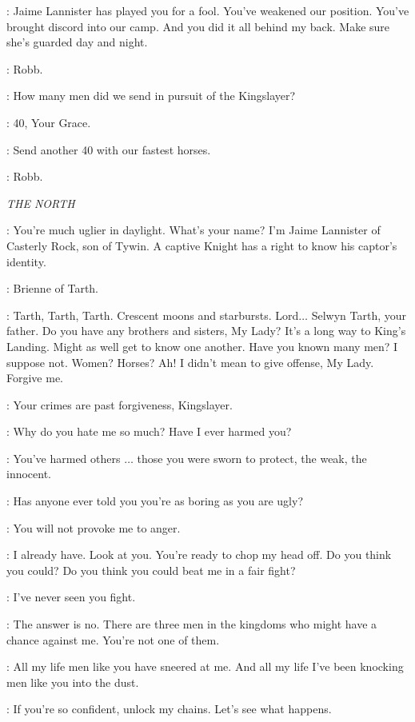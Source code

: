 \ROBB: Jaime Lannister has played you for a fool. You've weakened our position. You've brought discord into our camp. And you did it all behind my back. Make sure she's guarded day and night. 

\CATELYN: Robb. 

\ROBB: How many men did we send in pursuit of the Kingslayer? 

\KARSTARK: 40, Your Grace. 

\ROBB: Send another 40 with our fastest horses. 

\CATELYN: Robb. 

\scene

\textit{THE NORTH} 


\JAIME: You're much uglier in daylight. What's your name? I'm Jaime Lannister of Casterly Rock, son of Tywin. A captive Knight has a right to know his captor's identity. 

\BRIENNE: Brienne of Tarth. 

\JAIME: Tarth, Tarth, Tarth. Crescent moons and starbursts. Lord$\ldots$ Selwyn Tarth, your father. Do you have any brothers and sisters, My Lady? It's a long way to King's Landing. Might as well get to know one another. Have you known many men? I suppose not. Women? Horses? Ah! I didn't mean to give offense, My Lady. Forgive me. 

\BRIENNE: Your crimes are past forgiveness, Kingslayer. 

\JAIME: Why do you hate me so much? Have I ever harmed you? 

\BRIENNE: You've harmed others $\ldots$  those you were sworn to protect, the weak, the innocent. 

\JAIME: Has anyone ever told you you're as boring as you are ugly? 

\BRIENNE: You will not provoke me to anger. 

\JAIME: I already have. Look at you. You're ready to chop my head off. Do you think you could? Do you think you could beat me in a fair fight? 

\BRIENNE: I've never seen you fight. 

\JAIME: The answer is no. There are three men in the kingdoms who might have a chance against me. You're not one of them. 

\BRIENNE: All my life men like you have sneered at me. And all my life I've been knocking men like you into the dust. 

\JAIME: If you're so confident, unlock my chains. Let's see what happens. 

